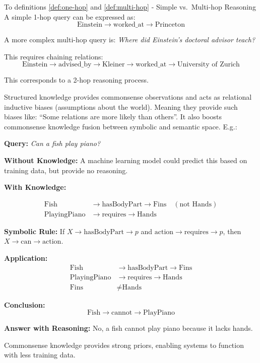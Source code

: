 \begin{bsp}
    To definitions \autoref{def:one-hop} and \autoref{def:multi-hop} - Simple vs.\ Multi-hop Reasoning \\
    A simple 1-hop query can be expressed as:
    \[
        \text{Einstein} \rightarrow \text{worked\_at} \rightarrow \text{Princeton}
    \]

    A more complex multi-hop query is:
    \emph{Where did Einstein's doctoral advisor teach?}

    This requires chaining relations:
    \[
        \text{Einstein} \rightarrow \text{advised\_by} \rightarrow \text{Kleiner} \rightarrow \text{worked\_at} \rightarrow \text{University of Zurich}
    \]

    This corresponds to a 2-hop reasoning process.
\end{bsp}
Structured knowledge provides commonsense observations and acts as relational inductive biases (assumptions about
the world). Meaning they provide such biases like: ``Some relations are more likely than others''. It also boosts
commonsense knowledge fusion between symbolic and semantic space. E.g.:
\begin{bsp}
    \textbf{Query:} \emph{Can a fish play piano?}

    \textbf{Without Knowledge:}
    A machine learning model could predict this based on training data, but provide no reasoning.

    \textbf{With Knowledge:}

    \begin{align*}
        \text{Fish} &\rightarrow \text{hasBodyPart} \rightarrow \text{Fins} \quad (\text{not Hands}) \\
        \text{PlayingPiano} &\rightarrow \text{requires} \rightarrow \text{Hands}
    \end{align*}

    \textbf{Symbolic Rule:}
    If $X \rightarrow \text{hasBodyPart} \rightarrow p$ and $\text{action} \rightarrow \text{requires} \rightarrow p$,
    then $X \rightarrow \text{can} \rightarrow \text{action}$.

    \textbf{Application:}
    \begin{align*}
        \text{Fish} &\rightarrow \text{hasBodyPart} \rightarrow \text{Fins} \\
        \text{PlayingPiano} &\rightarrow \text{requires} \rightarrow \text{Hands} \\
        \text{Fins} &\neq \text{Hands}
    \end{align*}

    \textbf{Conclusion:}
    \[
        \text{Fish} \rightarrow \text{cannot} \rightarrow \text{PlayPiano}
    \]

    \textbf{Answer with Reasoning:}
    No, a fish cannot play piano because it lacks hands.
\end{bsp}
Commonsense knowledge provides strong priors, enabling systems to function with less training data.

